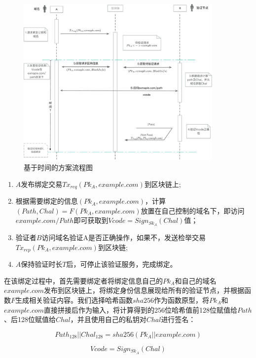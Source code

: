 \begin{figure}[htbp]
 	\centering
 	\includegraphics[width = 0.9\textwidth]{img/time_based_workflow}
 	\caption{基于时间的方案流程图}\label{fig:time_based_workflow}
\end{figure}


\begin{enumerate}
	\item $A$发布绑定交易$Tx_{req}(Pk_A, example.com)$到区块链上;
	\item 根据需要绑定的信息$(Pk_A, example.com)$，计算$(Path, Chal) = F(Pk_A, example.com)$放置在自己控制的域名下，即访问$example.com/Path$即可获取到$Vcode = Sign_{Sk_A}(Chal)$值；
	\item 验证者$B$访问域名验证A是否正确操作，如果不，发送检举交易$Tx_{rep}(Pk_A, example.com)$到区块链;
	\item $A$保持验证时长$T$后，可停止该验证服务，完成绑定。
\end{enumerate}


在该绑定过程中，首先需要绑定者将绑定信息自己的$Pk_A$和自己的域名$example.com$发布到区块链上，将绑定身份信息展现给所有的验证节点，并根据函数$F$生成相关验证内容。我们选择哈希函数$sha256$作为函数原型，将$Pk_A$和$example.com$直接拼接后作为输入，将计算得到的256位哈希值前128位赋值给$Path$、后128位赋值给$Chal$，并且使用自己的私钥对$Chal$进行签名：

\begin{equation}\label{eqF}
Path_{128}||Chal_{128} = sha256(Pk_A||example.com)
\end{equation}

\begin{equation}\label{eqSign}
Vcode = Sign_{Sk_A}(Chal)
\end{equation}

